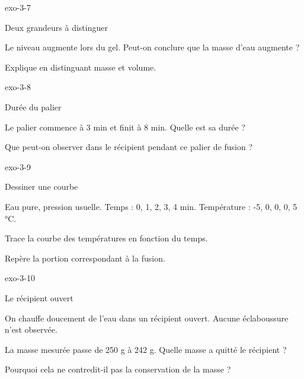 \documentclass[12pt,twoside,openany]{book}
\begin{document}
\begin{blocLivre}{exo-3-7}
\begin{exercice}[2]{Deux grandeurs à distinguer}
\begin{questions}
\item Le niveau augmente lors du gel. Peut-on conclure que la masse d’eau augmente ?
\item Explique en distinguant masse et volume.
\end{questions}
\end{exercice}\end{blocLivre}
\begin{blocLivre}{exo-3-8}
\begin{exercice}[2]{Durée du palier}
\begin{questions}
\item Le palier commence à 3 min et finit à 8 min. Quelle est sa durée ?
\item Que peut-on observer dans le récipient pendant ce palier de fusion ?
\end{questions}
\end{exercice}\end{blocLivre}
\begin{blocLivre}{exo-3-9}
\begin{exercice}[2]{Dessiner une courbe}
\begin{donnees}Eau pure, pression usuelle. Temps : 0, 1, 2, 3, 4 min. Température : -5, 0, 0, 0, 5 °C.\par
\end{donnees}
\begin{questions}
\item Trace la courbe des températures en fonction du temps.
\item Repère la portion correspondant à la fusion.
\end{questions}
\end{exercice}\end{blocLivre}
\begin{blocLivre}{exo-3-10}
\begin{exercice}[2]{Le récipient ouvert}
\begin{donnees}On chauffe doucement de l’eau dans un récipient ouvert. Aucune éclaboussure n’est observée.\par
\end{donnees}
\begin{questions}
\item La masse mesurée passe de 250 g à 242 g. Quelle masse a quitté le récipient ?
\item Pourquoi cela ne contredit-il pas la conservation de la masse ?
\end{questions}
\end{exercice}\end{blocLivre}
\end{document}
